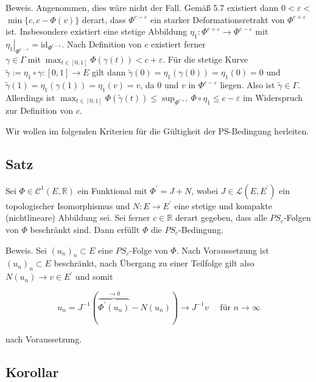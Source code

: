 \documentclass[10pt, letterpaper]{article}
\begin{document}
Beweis. Angenommen, dies wäre nicht der Fall. Gemäß 5.7 existiert dann $0<\varepsilon<$ $\min \{c, c-\Phi(v)\}$ derart, dass $\Phi^{c-\varepsilon}$ ein starker Deformationsretrakt von $\Phi^{c+\varepsilon}$ ist. Insbesondere existiert eine stetige Abbildung $\eta_{1}: \Phi^{c+\varepsilon} \rightarrow \Phi^{c-\varepsilon}$ mit $\left.\eta_{1}\right|_{\Phi^{c-\varepsilon}}=\mathrm{id}_{\Phi^{c-\varepsilon}}$. Nach Definition von $c$ existiert ferner $\gamma \in \Gamma \operatorname{mit} \max _{t \in[0,1]} \Phi(\gamma(t))<c+\varepsilon$. Für die stetige Kurve $\tilde{\gamma}:=\eta_{1} \circ \gamma:[0,1] \rightarrow E$ gilt dann $\tilde{\gamma}(0)=\eta_{1}(\gamma(0))=\eta_{1}(0)=0$ und $\tilde{\gamma}(1)=\eta_{1}(\gamma(1))=\eta_{1}(v)=v$, da 0 und $v$ in $\Phi^{c-\varepsilon}$ liegen. Also ist $\tilde{\gamma} \in \Gamma$. Allerdings ist $\max _{t \in[0,1]} \Phi(\tilde{\gamma}(t)) \leq \sup _{\Phi^{c+\varepsilon}} \Phi \circ \eta_{1} \leq c-\varepsilon$ im Widerspruch zur Definition von $c$.

Wir wollen im folgenden Kriterien für die Gültigkeit der PS-Bedingung herleiten.

\subsection*{Satz}

Sei $\Phi \in \mathcal{C}^{1}(E, \mathbb{R})$ ein Funktional mit $\Phi^{\prime}=J+N$, wobei $J \in \mathcal{L}\left(E, E^{\prime}\right)$ ein topologischer Isomorphismus und $N: E \rightarrow E^{\prime}$ eine stetige und kompakte (nichtlineare) Abbildung sei. Sei ferner $c \in \mathbb{R}$ derart gegeben, dass alle $P S_{c}$-Folgen von $\Phi$ beschränkt sind. Dann erfüllt $\Phi$ die $P S_{c}$-Bedingung.

Beweis. Sei $\left(u_{n}\right)_{n} \subset E$ eine $P S_{c}$-Folge von $\Phi$. Nach Voraussetzung ist $\left(u_{n}\right)_{n} \subset E$ beschränkt, nach Übergang zu einer Teilfolge gilt also $N\left(u_{n}\right) \rightarrow v \in E^{\prime}$ und somit

$$
u_{n}=J^{-1}(\overbrace{\Phi^{\prime}\left(u_{n}\right)}^{\rightarrow 0}-N\left(u_{n}\right)) \rightarrow J^{-1} v \quad \text { für } n \rightarrow \infty
$$

nach Voraussetzung.

\subsection*{Korollar}
\end{document}
